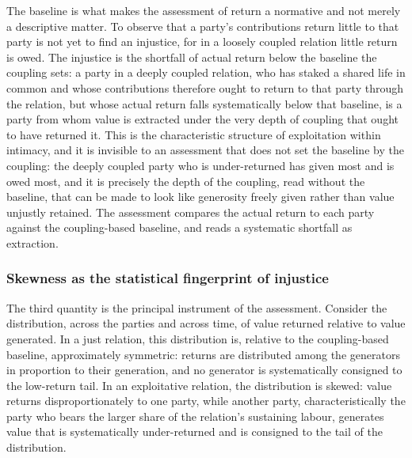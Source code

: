 The baseline is what makes the assessment of return a normative and not merely a descriptive matter. To observe that a party's contributions return little to that party is not yet to find an injustice, for in a loosely coupled relation little return is owed. The injustice is the shortfall of actual return below the baseline the coupling sets: a party in a deeply coupled relation, who has staked a shared life in common and whose contributions therefore ought to return to that party through the relation, but whose actual return falls systematically below that baseline, is a party from whom value is extracted under the very depth of coupling that ought to have returned it. This is the characteristic structure of exploitation within intimacy, and it is invisible to an assessment that does not set the baseline by the coupling: the deeply coupled party who is under-returned has given most and is owed most, and it is precisely the depth of the coupling, read without the baseline, that can be made to look like generosity freely given rather than value unjustly retained. The assessment compares the actual return to each party against the coupling-based baseline, and reads a systematic shortfall as extraction.

\subsubsection{Skewness as the statistical fingerprint of injustice}
\label{p11:sec:ev-skew}

The third quantity is the principal instrument of the assessment. Consider the distribution, across the parties and across time, of value returned relative to value generated. In a just relation, this distribution is, relative to the coupling-based baseline, approximately symmetric: returns are distributed among the generators in proportion to their generation, and no generator is systematically consigned to the low-return tail. In an exploitative relation, the distribution is skewed: value returns disproportionately to one party, while another party, characteristically the party who bears the larger share of the relation's sustaining labour, generates value that is systematically under-returned and is consigned to the tail of the distribution.

